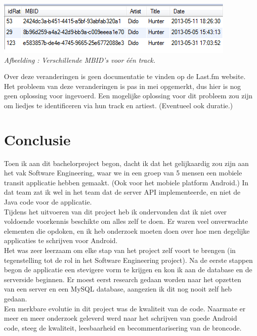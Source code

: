 \documentclass[11pt,a4paper]{article}
\newcounter{figc}
\newcommand{\increaseFigID} {%
   \stepcounter{figc}%
   \thefigc}
\newcommand{\figID}[1]{\small \textit{Afbeelding \increaseFigID : #1} \\ \normalsize}
\begin{document}
	\includegraphics[scale=1]{Pictures/mbid_change.png} \\
	\figID{Verschillende MBID's voor één track.}
	
	Over deze veranderingen is geen documentatie te vinden op de Last.fm website. Het probleem van deze veranderingen is pas in mei opgemerkt, dus hier is nog geen oplossing voor ingevoerd. Een mogelijke oplossing voor dit probleem zou zijn om liedjes te identificeren via hun track en artiest. (Eventueel ook duratie.) 


\newpage	
\section{Conclusie}
	\label{sec:Conclusie}
	
Toen ik aan dit bachelorproject begon, dacht ik dat het gelijkaardig zou zijn aan het vak Software Engineering, waar we in een groep van 5 mensen een mobiele transit applicatie hebben gemaakt. (Ook voor het mobiele platform Android.) In dat team zat ik wel in het team dat de server API implementeerde, en niet de Java code voor de applicatie. \\

Tijdens het uitvoeren van dit project heb ik ondervonden dat ik niet over voldoende voorkennis beschikte om alles zelf te doen. Er waren veel onverwachte elementen die opdoken, en ik heb onderzoek moeten doen over hoe men degelijke applicaties te schrijven voor Android. \\

Het was zeer leerzaam om elke stap van het project zelf voort te brengen (in tegenstelling tot de rol in het Software Engineering project). Na de eerste stappen begon de applicatie een stevigere vorm te krijgen en kon ik aan de database en de serverside beginnen. Er moest eerst research gedaan worden naar het opzetten van een server en een MySQL database, aangezien ik dit nog nooit zelf heb gedaan. \\

Een merkbare evolutie in dit project was de kwaliteit van de code. Naarmate er meer en meer onderzoek geleverd werd naar het schrijven van goede Android code, steeg de kwaliteit, leesbaarheid en becommentarisering van de broncode. \\
\end{document}
